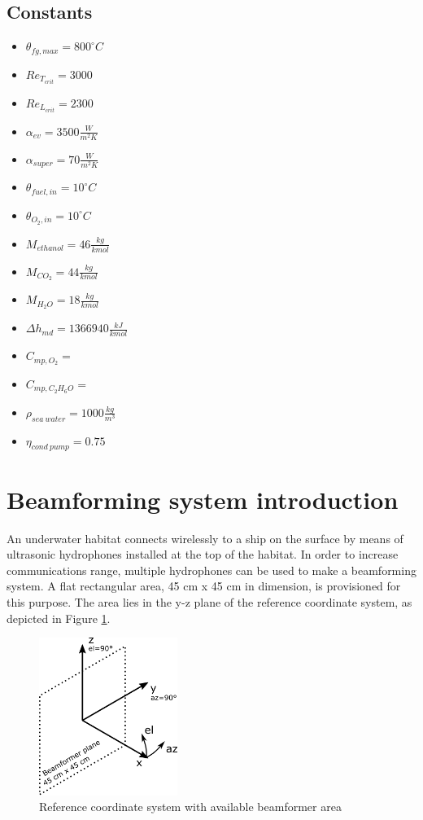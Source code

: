 \documentclass{article}
\begin{document}
	\subsection{Constants}
	
	\begin{itemize}
		\item $\theta_{fg,max} = 800 ^\circ C$
		\item $Re_{T_{crit}} = 3000$
		\item $Re_{L_{crit}} = 2300$
		\item $\alpha_{ev} = 3500 \frac{W}{m^2K}$
		\item $\alpha_{super} = 70 \frac{W}{m^2K}$
		\item $\theta_{fuel,in} = 10 ^\circ C$
		\item $\theta_{O_2,in} = 10 ^\circ C$
		\item $M_{ethanol} = 46 \frac{kg}{kmol}$
		\item $M_{CO_2} = 44 \frac{kg}{kmol}$
		\item $M_{H_2O} = 18 \frac{kg}{kmol}$
		\item $\Delta h_{md} = 1366940 \frac{kJ}{kmol}$
		\item $C_{mp,O_2}  = $
		\item $C_{mp,C_2H_6O} = $
		\item $\rho_{sea\ water} = 1000 \frac{kg}{m^3}$
		\item $\eta_{cond\ pump} = 0.75$
	\end{itemize}


\section{Beamforming system introduction}

An underwater habitat connects wirelessly to a ship on the surface by means of 
ultrasonic hydrophones installed at the top of the habitat. In order to 
increase communications range, multiple hydrophones can be used to make a 
beamforming system. A flat rectangular area, 45 cm x 45 cm in dimension, is 
provisioned for this purpose. The area lies in the y-z plane of the reference 
coordinate system, as depicted in Figure \ref{fig:coord}.
\begin{figure}[h!]
	\centering
	\includegraphics[width=0.4\textwidth]{coord.png}
	\caption{Reference coordinate system with available beamformer area}
	\label{fig:coord}
\end{figure}
\end{document}

